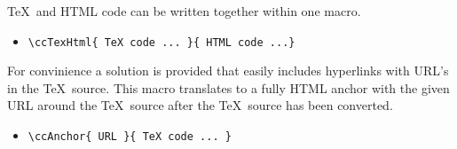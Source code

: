 \documentclass[12pt]{article}
\begin{document}
\TeX\ and HTML code can be written together within one macro.

\begin{itemize}
    \item
        \verb+\ccTexHtml{ TeX code ... }{ HTML code ...}+
\end{itemize}

For convinience a solution is provided that easily includes
hyperlinks with URL's in the \TeX\ source. This macro translates to a
fully HTML anchor with the given URL around the \TeX\ source after the
\TeX\ source has been converted.

\begin{itemize}
    \item
        \verb+\ccAnchor{ URL }{ TeX code ... }+
\end{itemize}
\end{document}
